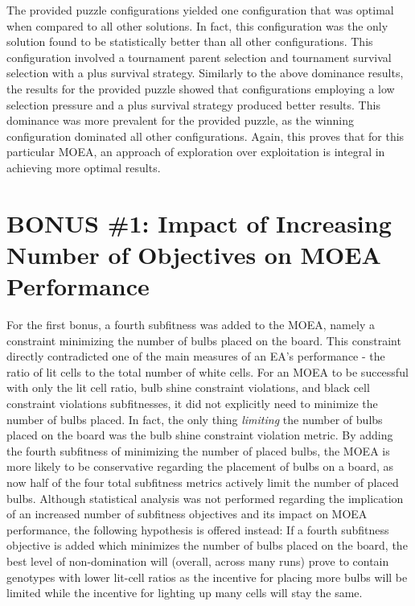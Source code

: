 \documentclass[11pt]{article}
\begin{document}


The provided puzzle configurations yielded one configuration that was optimal when compared 
to all other solutions. In fact,
this configuration was the only solution found to be statistically better than all other 
configurations. This configuration involved
a tournament parent selection and tournament survival selection with a plus survival strategy.
Similarly to the above dominance results, the results for the provided puzzle showed that 
configurations employing a low selection pressure and a plus survival strategy produced better 
results. This dominance was more prevalent for the provided puzzle, as the winning configuration
dominated all other configurations. Again, this proves that for this particular MOEA, an approach
of exploration over exploitation is integral in achieving more optimal results.



\section{BONUS \#1: Impact of Increasing Number of Objectives on MOEA Performance}

For the first bonus, a fourth subfitness was added to the MOEA, namely a constraint minimizing
the number of bulbs placed on the board. This constraint directly contradicted one of the main
measures of an EA's performance - the ratio of lit cells to the total number of white cells.
For an MOEA to be successful with only the lit cell ratio, bulb shine constraint violations, and
black cell constraint violations subfitnesses, it did not explicitly need to minimize the number 
of bulbs
placed. In fact, the only thing \textit{limiting} the number of bulbs placed on the board was the
bulb shine constraint violation metric. By adding the fourth subfitness of minimizing the number
of placed bulbs, the MOEA is more likely to be conservative regarding the placement of bulbs on
a board, as now half of the four total subfitness metrics actively limit the number of placed bulbs.
Although statistical analysis was not performed regarding the implication of an increased number
of subfitness objectives and its impact on MOEA performance, the following hypothesis is offered
instead: If a fourth subfitness objective is added which minimizes the number of bulbs placed
on the board, the best level of non-domination will (overall, across many runs) prove to contain 
genotypes with lower lit-cell ratios as the incentive for placing more bulbs will be limited
while the incentive for lighting up many cells will stay the same.
\end{document}
